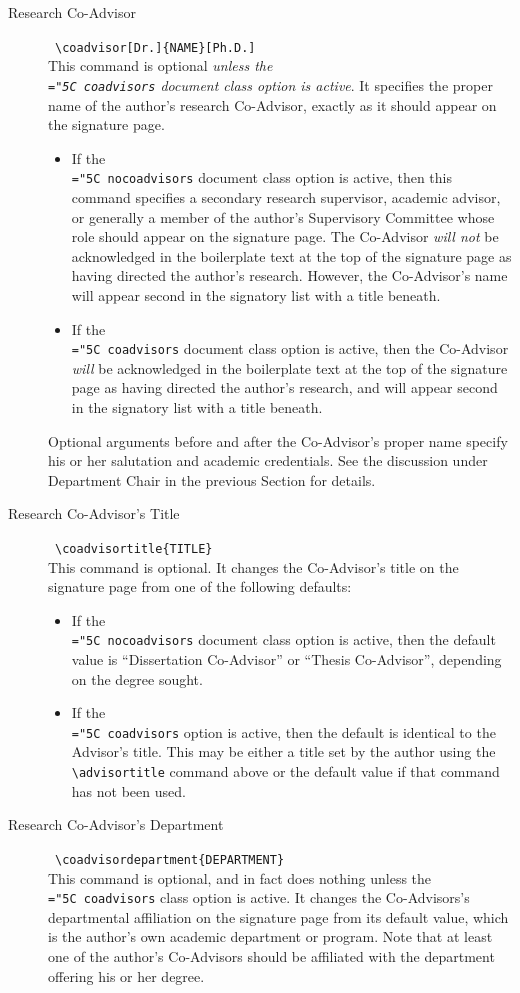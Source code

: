 \documentclass[11pt]{article}
\newcommand\code[1]{{\normalfont\texttt{\let\dv\textsl\chardef\\="5C #1}}}
\begin{document}
\begin{description}
\item[\llap{*}Research Co-Advisor] \dotfill\ \verb=\coadvisor[Dr.]{NAME}[Ph.D.]=\\
This command is optional \textit{unless the \code{coadvisors} document class option is active}.  It specifies the proper name of the author's research Co-Advisor, exactly as it should appear on the signature page.
%
\begin{itemize}
\item If the \code{nocoadvisors} document class option is active, then this command specifies a secondary research supervisor, academic advisor, or generally a member of the author's Supervisory Committee whose role should appear on the signature page.  The Co-Advisor \textit{will not} be acknowledged in the boilerplate text at the top of the signature page as having directed the author's research.  However, the Co-Advisor's name will appear second in the signatory list with a title beneath.
%
\item If the \code{coadvisors} document class option is active, then the Co-Advisor \textit{will} be acknowledged in the boilerplate text at the top of the signature page as having directed the author's research, and will appear second in the signatory list with a title beneath.
\end{itemize}
%
Optional arguments before and after the Co-Advisor's proper name specify his or her salutation and academic credentials.  See the discussion under Department Chair in the previous Section for details.

\item[\llap{*}Research Co-Advisor's Title] \dotfill\ \verb=\coadvisortitle{TITLE}=\\
This command is optional.  It changes the Co-Advisor's title on the signature page from one of the following defaults:
%
\begin{itemize}
\item If the \code{nocoadvisors} document class option is active, then the default value is ``Dissertation Co-Advisor'' or ``Thesis Co-Advisor'', depending on the degree sought.
%
\item If the \code{coadvisors} option is active, then the default is identical to the Advisor's title.  This may be either a title set by the author using the \verb=\advisortitle= command above or the default value if that command has not been used.
\end{itemize}

\item[\llap{*}Research Co-Advisor's Department] \dotfill\ \verb=\coadvisordepartment{DEPARTMENT}=\\
This command is optional, and in fact does nothing unless the \code{coadvisors} class option is active.  It changes the Co-Advisors's departmental affiliation on the signature page from its default value, which is the author's own academic department or program.  Note that at least one of the author's Co-Advisors should be affiliated with the department offering his or her degree.


\end{description}
\end{document}
